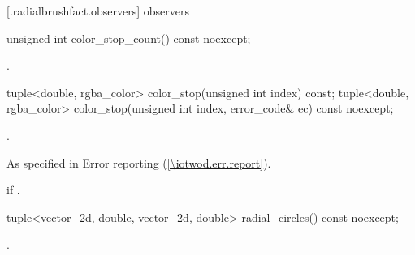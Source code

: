 [\iotwod.radialbrushfact.observers] { observers}

\begin{itemdecl}
    unsigned int color_stop_count() const noexcept;
\end{itemdecl}
\begin{itemdescr}
	\pnum
	\returns
	.

\end{itemdescr}

\begin{itemdecl}
    tuple<double, rgba_color> color_stop(unsigned int index) const;
    tuple<double, rgba_color> color_stop(unsigned int index,
      error_code& ec) const noexcept;
\end{itemdecl}
\begin{itemdescr}
	\pnum
	\returns
	.

	\pnum
	\throws
	As specified in Error reporting (\ref{\iotwod.err.report}).
	
	\pnum
	\errors
	 if .

\end{itemdescr}

\begin{itemdecl}
    tuple<vector_2d, double, vector_2d, double> radial_circles() const noexcept;
\end{itemdecl}
\begin{itemdescr}
	\pnum
	\returns
	.

\end{itemdescr}
